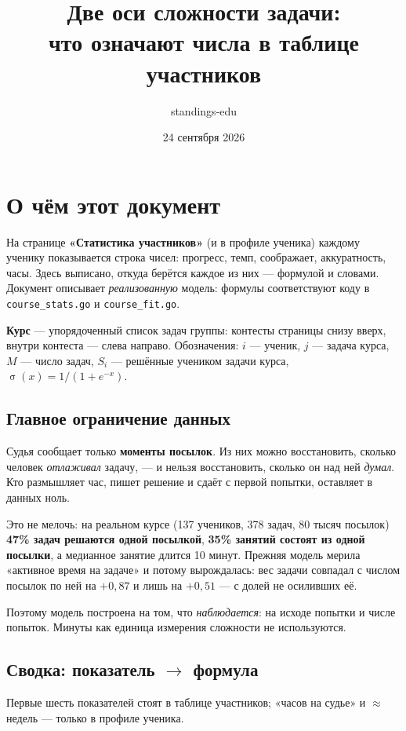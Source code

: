 \documentclass[11pt,a4paper]{article}
\title{Две оси сложности задачи:\\ что означают числа в таблице участников}
\author{standings-edu}
\date{24 сентября 2026}
\newcommand{\sig}{\operatorname{\sigma}}
\begin{document}
\maketitle

\section{О чём этот документ}

На странице \textbf{«Статистика участников»} (и в профиле ученика) каждому
ученику показывается строка чисел: прогресс, темп, соображает, аккуратность,
часы. Здесь выписано,
откуда берётся каждое из них --- формулой и словами. Документ описывает
\emph{реализованную} модель: формулы соответствуют коду в
\texttt{course\_stats.go} и \texttt{course\_fit.go}.

\textbf{Курс} --- упорядоченный список задач группы: контесты страницы снизу
вверх, внутри контеста --- слева направо. Обозначения: $i$ --- ученик, $j$ ---
задача курса, $M$ --- число задач, $S_i$ --- решённые учеником задачи курса,
$\sig(x) = 1/(1+e^{-x})$.

\subsection*{Главное ограничение данных}

Судья сообщает только \textbf{моменты посылок}. Из них можно восстановить,
сколько человек \emph{отлаживал} задачу, --- и нельзя восстановить, сколько он
над ней \emph{думал}. Кто размышляет час, пишет решение и сдаёт с первой
попытки, оставляет в данных ноль.

Это не мелочь: на реальном курсе (137 учеников, 378 задач, 80 тысяч посылок)
\textbf{47\% задач решаются одной посылкой}, \textbf{35\% занятий состоят из
одной посылки}, а медианное занятие длится 10 минут. Прежняя модель мерила
«активное время на задаче» и потому вырождалась: вес задачи совпадал с числом
посылок по ней на $+0{,}87$ и лишь на $+0{,}51$ --- с долей не осиливших её.

Поэтому модель построена на том, что \emph{наблюдается}: на исходе попытки и
числе попыток. Минуты как единица измерения сложности не используются.

\subsection*{Сводка: показатель $\to$ формула}

Первые шесть показателей стоят в таблице участников; «часов на судье» и
$\approx$недель --- только в профиле ученика.
\end{document}
